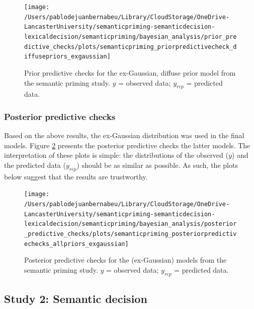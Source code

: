 \documentclass[
  12pt,
  man,floatsintext]{apa7}
\begin{document}
\begin{figure}

{\centering \texttt{[image: /Users/pablodejuanbernabeu/Library/CloudStorage/OneDrive-LancasterUniversity/semanticpriming-semanticdecision-lexicaldecision/semanticpriming/bayesian\_analysis/prior\_predictive\_checks/plots/semanticpriming\_priorpredictivecheck\_diffusepriors\_exgaussian]} 

}

\caption{Prior predictive checks for the ex-Gaussian, diffuse prior model from the semantic priming study. \(y\) = observed data; \(y_{rep}\) = predicted data.}\label{fig:semanticpriming-priorpredictivecheck-diffusepriors-exgaussian}
\end{figure}

\hypertarget{posterior-predictive-checks}{%
\subsubsection{Posterior predictive checks}\label{posterior-predictive-checks}}

Based on the above results, the ex-Gaussian distribution was used in the final models. Figure \ref{fig:semanticpriming-posteriorpredictivechecks-allpriors-exgaussian} presents the posterior predictive checks the latter models. The interpretation of these plots is simple: the distributions of the observed (\(y\)) and the predicted data (\(y_{rep}\)) should be as similar as possible. As such, the plots below suggest that the results are trustworthy.



\begin{figure}

{\centering \texttt{[image: /Users/pablodejuanbernabeu/Library/CloudStorage/OneDrive-LancasterUniversity/semanticpriming-semanticdecision-lexicaldecision/semanticpriming/bayesian\_analysis/posterior\_predictive\_checks/plots/semanticpriming\_posteriorpredictivechecks\_allpriors\_exgaussian]} 

}

\caption{Posterior predictive checks for the (ex-Gaussian) models from the semantic priming study. \(y\) = observed data; \(y_{rep}\) = predicted data.}\label{fig:semanticpriming-posteriorpredictivechecks-allpriors-exgaussian}
\end{figure}

\hypertarget{study-2-semantic-decision-3}{%
\subsection{Study 2: Semantic decision}\label{study-2-semantic-decision-3}}
\end{document}
